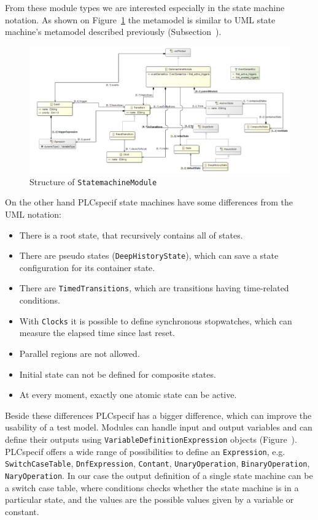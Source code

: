 \begin{enumerate}
From these module types we are interested especially in the state machine notation. As shown on Figure~\ref{fig:plchsm_statemachine} the metamodel is similar to UML state machine's metamodel described previously (Subsection~\cite{ssub:umlstatemachine}).

\begin{figure}[htp]
\centering
\includegraphics[scale=0.5]{figures/plchsm_statemachine}
\caption{Structure of \texttt{StatemachineModule} \cite{plcspecif}}
\label{fig:plchsm_statemachine}
\end{figure}

On the other hand PLCspecif state machines have some differences from the UML notation:

\begin{itemize}
	\item There is a root state, that recursively contains all of states.
	\item There are pseudo states (\texttt{DeepHistoryState}), which can save a state configuration for its container state.
	\item There are \texttt{TimedTransitions}, which are transitions having time-related conditions.
	\item With \texttt{Clocks} it is possible to define synchronous stopwatches, which can measure the elapsed time since last reset.
	\item Parallel regions are not allowed.
	\item Initial state can not be defined for composite states.
	\item At every moment, exactly one atomic state can be active. 
\end{itemize}

Beside these differences PLCspecif has a bigger difference, which can improve the usability of a test model. Modules can handle input and output variables and can define their outputs using \texttt{VariableDefinitionExpression} objects (Figure~\cite{fig:plchsm_variables}). PLCspecif offers a wide range of possibilities to define an \texttt{Expression}, e.g. \texttt{SwitchCaseTable}, \texttt{DnfExpression}, \texttt{Contant}, \texttt{UnaryOperation}, \texttt{BinaryOperation}, \texttt{NaryOperation}. In our case the output definition of a single state machine can be a switch case table, where conditions checks whether the state machine is in a particular state, and the values are the possible values given by a variable or constant.


\end{enumerate}

